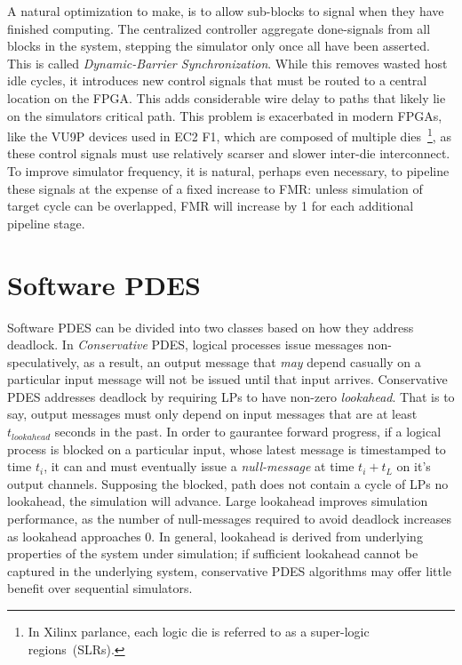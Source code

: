 A natural optimization to make, is to allow sub-blocks to signal when they have
finished computing.  The centralized controller aggregate done-signals from all
blocks in the system, stepping the simulator only once all have been asserted.
This is called \emph{Dynamic-Barrier Synchronization}. While this removes
wasted host idle cycles, it introduces new control signals that must be routed
to a central location on the FPGA. This adds considerable wire delay to paths
that likely lie on the simulators critical path. This problem is exacerbated in
modern FPGAs, like the VU9P devices used in EC2 F1, which are composed of
multiple dies~\footnote{In Xilinx parlance, each logic die is referred to as a
super-logic regions~(SLRs).}, as these control signals must use relatively
scarser and slower inter-die interconnect. To improve simulator frequency, it
is natural, perhaps even necessary, to pipeline these signals at the expense of
a fixed increase to FMR: unless simulation of target cycle can be overlapped,
FMR will increase by 1 for each additional pipeline stage.



\section{Software PDES}
Software PDES can be divided into two classes based on how they address
deadlock.  In \emph{Conservative} PDES, logical processes issue messages
non-speculatively, as a result, an output message that \emph{may} depend casually on a
particular input message will not be issued until that input arrives.
Conservative PDES addresses deadlock by requiring LPs to have non-zero
\emph{lookahead}. That is to say, output messages must only depend on input
messages that are at least  $t_{lookahead}$ seconds in the past. In order to gaurantee forward
progress, if a logical process is blocked on a particular input, whose latest
message is timestamped to time $t_{i}$, it can and must eventually issue a
\emph{null-message} at time $t_{i} + t_{L}$ on it's output channels. Supposing
the blocked, path does not contain a cycle of LPs no lookahead, the simulation
will advance.  Large lookahead improves simulation performance, as the number
of null-messages required to avoid deadlock increases as lookahead approaches 0.
In general, lookahead is derived from underlying properties of the system under simulation;
if sufficient lookahead cannot be captured in the underlying system, conservative PDES algorithms may
offer little benefit over sequential simulators.

